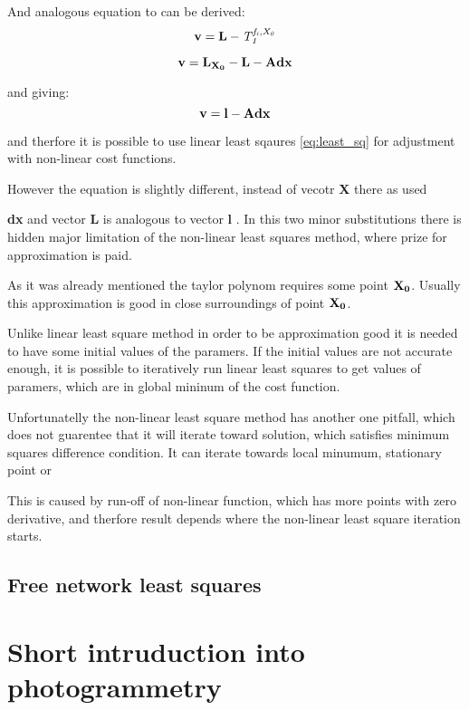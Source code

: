 \documentclass[a4paper,12pt]{report}
\newcommand{\ematr}[1]{
{\bf #1}
}
\newcommand{\evect}[1]{
{\bf #1}
}
\newcommand{\efunc}[1]{
{\it #1}
}
\begin{document}
And analogous equation to \label{eq:least_v} can be derived:
\begin{equation}
\evect{v} = \evect{L} - \efunc{T^{f_{i}, X_{0}}_{1}}
\end{equation} 

\begin{equation}
\evect{v} =  \evect{L_{X_{0}}} - \evect{L} - \ematr{A}\evect{dx}
\end{equation} 

and giving:
\begin{equation}
\evect{v} = \evect{l} - \ematr{A}\evect{dx}
\end{equation} 



and therfore it is possible to use linear least sqaures \eqref{eq:least_sq} for adjustment 
with non-linear cost functions.

However the equation is slightly different, instead of vecotr \evect{X} there as used 
\evect{dx} and vector  \evect{L} is analogous to vector \evect{l}. In this two minor 
substitutions there is hidden major limitation of the non-linear least squares method, 
where prize for approximation is paid. 

As it was already mentioned the taylor polynom requires some point $\evect{X_{0}}$.
Usually this approximation is good in close surroundings of point $\evect{X_{0}}$.

Unlike linear least square method in order to be approximation good it is needed to 
have some initial values of the paramers. If the initial values are not accurate 
enough, it is possible to iteratively run linear least squares to get values 
of paramers, which are in global mininum of the cost function. 

Unfortunatelly the non-linear least square method has another one pitfall, which 
does not guarentee that it will iterate toward solution,
which satisfies minimum squares difference condition. It can iterate towards
local minumum, stationary point or 

This is caused by run-off of non-linear function, which has more points with zero derivative,
and therfore result depends where the non-linear least square iteration starts. 

\subsection{Free network least squares}
\label{sec:free_net_least}

\section{Short intruduction into photogrammetry}
\end{document}
